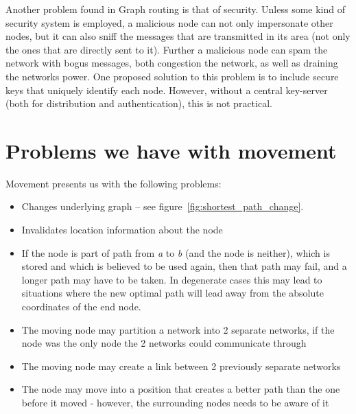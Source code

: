 \documentclass[letter, 12pt, english, draft]{article}
\begin{document}
Another problem found in Graph routing is that of security. Unless some kind of security system is employed, a malicious node can not only impersonate other nodes, but it can also sniff the messages that are transmitted in its area (not only the ones that are directly sent to it). Further a malicious node can spam the network with bogus messages, both congestion the network, as well as draining the networks power. One proposed solution to this problem is to include secure keys that uniquely identify each node. However, without a central key-server (both for distribution and authentication), this is not practical.

\section{Problems we have with movement}

Movement presents us with the following problems:


\begin{itemize}
\item Changes underlying graph -- see figure~\ref{fig:shortest_path_change}.
\item Invalidates location information about the node
\item If the node is part of path from \emph{a} to \emph{b} (and the node is neither), which is stored and which is believed to be used again, then that path may fail, and a longer path may have to be taken. In degenerate cases this may lead to situations where the new optimal path will lead away from the absolute coordinates of the end node.
\item The moving node may partition a network into 2 separate networks, if the node was the only node the 2 networks could communicate through
\item The moving node may create a link between 2 previously separate networks
\item The node may move into a position that creates a better path than the one before it moved - however, the surrounding nodes needs to be aware of it
\end{itemize}
\end{document}
